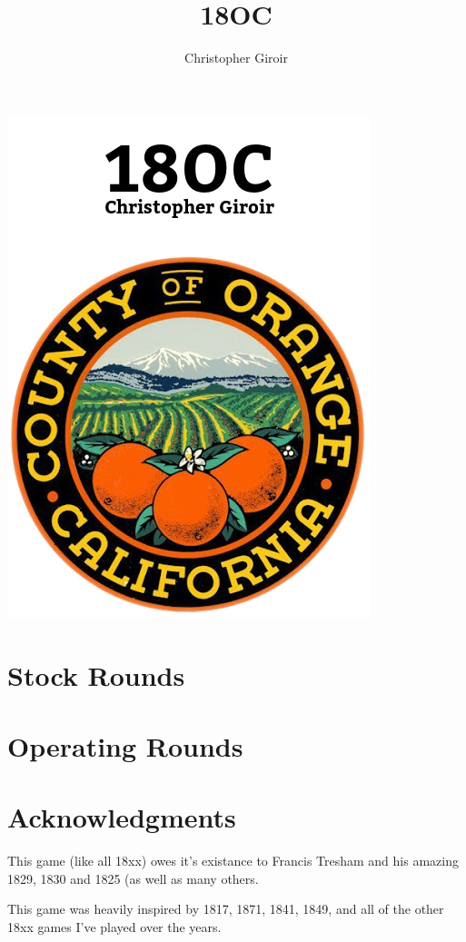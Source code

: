 \documentclass[letterpaper]{article}
\title{18OC}
\author{Christopher Giroir}
\begin{document}
\begin{titlepage}
  \begin{center}
    \vfill
    \includegraphics[width=400px]{18OC.png}
    \vfill
  \end{center}
\end{titlepage}

\newpage
\tableofcontents
\newpage

\begin{multicols}{2}
  \section{Stock Rounds}
  \section{Operating Rounds}
  \section{Acknowledgments}

  This game (like all 18xx) owes it's existance to Francis Tresham and his
  amazing 1829, 1830 and 1825 (as well as many others.

  This game was heavily inspired by 1817, 1871, 1841, 1849, and all of the
  other 18xx games I've played over the years.
\end{multicols}
\end{document}
